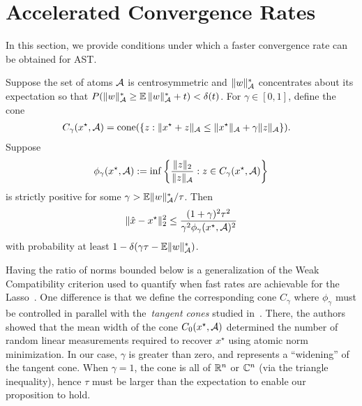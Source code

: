 \section{Accelerated Convergence Rates} %
\label{sec:convergence-rate}
In this section, we provide conditions under which a faster convergence rate
can be obtained for AST.
\begin{prop}
Suppose the set of atoms $\mathcal{A}$ is centrosymmetric and $\lVert w\rVert_{\mathcal{A}}^*$
concentrates about its expectation so that $P( {\lVert w\rVert_{\mathcal{A}}^*} \geq
\operatorname{\mathbb{E}}{\lVert w\rVert_{\mathcal{A}}^*}+t) < \delta(t)$. For $\gamma \in [0, 1]$, define the cone
\begin{align*}
C_\gamma(x^\star,\mathcal{A}) &= \operatorname{cone}(\{z:\lVert x^\star+ z\rVert_{\mathcal{A}} \leq \lVert x^\star\rVert_{\mathcal{A}} + \gamma\lVert z\rVert_{\mathcal{A}}\}).
\end{align*}
Suppose 
\begin{equation}
\label{eq:compatibility}
\phi_\gamma(x^\star,\mathcal{A}) := \inf \left\{ \frac{\lVert z\rVert_{2}}{\lVert z\rVert_{\mathcal{A}}}  : z \in C_\gamma(x^\star,\mathcal{A}) \right\} 
\end{equation}
is strictly positive for some $\gamma > {\operatorname{\mathbb{E}}\lVert w\rVert_{\mathcal{A}}^*}/{\tau}$. Then
\begin{equation}
\label{eq:fast_rate_phi}
\lVert\hat{x}-x^\star\rVert_2^2  \leq \frac{(1+\gamma)^2 \tau^2}{\gamma^2 \phi_\gamma(x^\star,\mathcal{A})^2}
\end{equation}
with probability at least $1-\delta(\gamma\tau - \operatorname{\mathbb{E}}\lVert w\rVert_{\mathcal{A}}^*)$.
\end{prop}

Having the ratio of norms bounded below is a generalization of the Weak
Compatibility criterion used to quantify when fast rates are achievable for the
Lasso~\cite{degeer}. One difference is that we define the corresponding
cone $C_\gamma$ where $\phi_\gamma$ must be controlled in parallel with
the~\emph{tangent cones} studied in~\cite{crpw}. There, the authors showed that
the mean width of the cone $C_0(x^\star,\mathcal{A})$ determined the number of random
linear measurements required to recover $x^\star$ using atomic norm
minimization.	 In our case, $\gamma$ is greater than zero, and represents a
``widening'' of the tangent cone. When $\gamma=1$, the cone is all of $\mathbb{R}^n$ or $\mathbb{C}^n$
(via the triangle inequality), hence $\tau$ must be larger than the
expectation to enable our proposition to hold.


